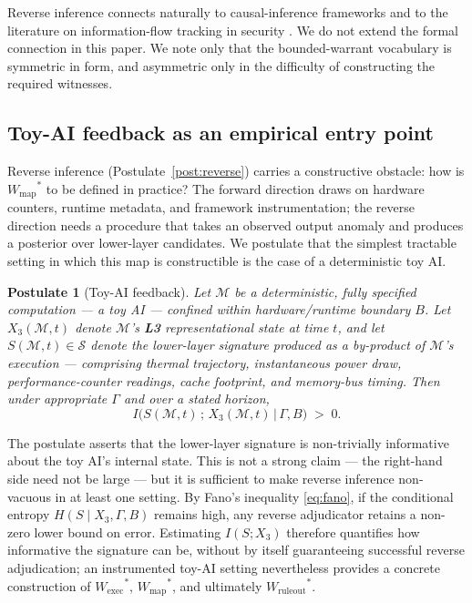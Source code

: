 \documentclass[11pt, a4paper]{article}
\theoremstyle{upldef}
\newtheorem{postulate}{Postulate}
\newcommand{\witness}[1]{\ensuremath{W_{\text{#1}}}}
\newcommand{\layer}[1]{\textbf{L#1}}
\begin{document}
Reverse inference connects naturally to causal-inference frameworks
\citep{pearl2009, rubin1974} and to the literature on
information-flow tracking in security \citep{kocher2019}. We do not
extend the formal connection in this paper. We note only that the
bounded-warrant vocabulary is symmetric in form, and asymmetric only
in the difficulty of constructing the required witnesses.

\subsection{Toy-AI feedback as an empirical entry point}
\label{sec:toyai}

Reverse inference (Postulate~\ref{post:reverse}) carries a
constructive obstacle: how is $\witness{map}^*$ to be defined in
practice? The forward direction draws on hardware counters,
runtime metadata, and framework instrumentation; the reverse
direction needs a procedure that takes an observed output anomaly
and produces a posterior over lower-layer candidates. We postulate
that the simplest tractable setting in which this map is
constructible is the case of a deterministic toy AI.

\begin{postulate}[Toy-AI feedback]\label{post:toyai}
Let $\mathcal{M}$ be a deterministic, fully specified computation
--- a \emph{toy AI} --- confined within hardware/runtime boundary
$B$. Let $X_3(\mathcal{M}, t)$ denote $\mathcal{M}$'s \layer{3}
representational state at time $t$, and let
$S(\mathcal{M}, t) \in \mathcal{S}$ denote the lower-layer signature
produced as a by-product of $\mathcal{M}$'s execution --- comprising
thermal trajectory, instantaneous power draw, performance-counter
readings, cache footprint, and memory-bus timing. Then under
appropriate $\Gamma$ and over a stated horizon,
\begin{equation}
I\bigl(S(\mathcal{M}, t)\,;\, X_3(\mathcal{M}, t) \,\big|\, \Gamma, B\bigr) \;>\; 0.
\label{eq:toyai}
\end{equation}
\end{postulate}

The postulate asserts that the lower-layer signature is
non-trivially informative about the toy AI's internal state. This is
not a strong claim --- the right-hand side need not be large --- but
it is sufficient to make reverse inference non-vacuous in at least
one setting. By Fano's inequality \eqref{eq:fano}, if the
conditional entropy $H(S \mid X_3, \Gamma, B)$ remains high, any
reverse adjudicator retains a non-zero lower bound on error.
Estimating $I(S; X_3)$ therefore quantifies how informative the
signature can be, without by itself guaranteeing successful reverse
adjudication; an instrumented toy-AI setting nevertheless provides a
concrete construction of $\witness{exec}^*$, $\witness{map}^*$, and
ultimately $\witness{ruleout}^*$.
\end{document}
